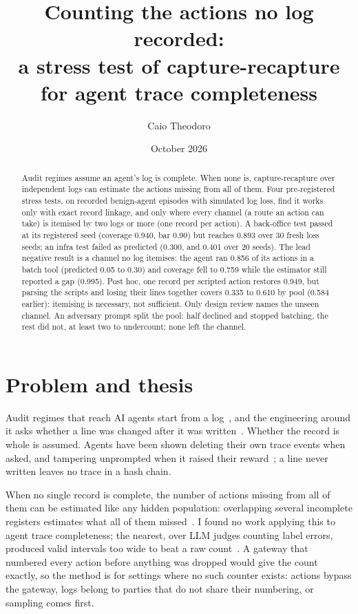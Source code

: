 \documentclass[11pt]{article}
\title{Counting the actions no log recorded:\\a stress test of capture-recapture for agent trace completeness}
\author{Caio Theodoro}
\date{October 2026}
\begin{document}
\maketitle

\begin{abstract}
Audit regimes assume an agent's log is complete. When none is, capture-recapture over
independent logs can estimate the actions missing from all of them. Four pre-registered
stress tests, on recorded benign-agent episodes with simulated log loss, find it works
only with exact record linkage, and only where every channel (a route an action can take)
is itemised by two logs or more (one record per action). A back-office test passed at its
registered seed (coverage 0.940, bar 0.90) but reaches 0.893 over 30 fresh loss seeds;
an infra test failed as predicted (0.300, and 0.401 over 20 seeds). The lead negative
result is a channel no log itemises: the agent ran 0.856 of its actions in a batch tool
(predicted 0.05 to 0.30) and coverage fell to 0.759 while the estimator still reported a
gap (0.995). Post hoc, one record per scripted action restores 0.949, but parsing the
scripts and losing their lines together covers 0.335 to 0.610 by pool (0.584 earlier):
itemising is necessary, not sufficient. Only design review names the unseen channel. An
adversary prompt split the pool: half declined and stopped batching, the rest did not, at
least two to undercount; none left the channel.
\end{abstract}

\section{Problem and thesis}

Audit regimes that reach AI agents start from a log~\citep{euaiact}, and the
engineering around it asks whether a line was changed after it was
written~\citep{flightrecorder2026,vet2025}. Whether the record is whole is
assumed. Agents have been shown deleting their own trace events when asked, and
tampering unprompted when it raised their reward~\citep{qin2026tamper}; a line
never written leaves no trace in a hash chain.

When no single record is complete, the number of actions missing from all of them can
be estimated like any hidden population: overlapping several incomplete registers
estimates what all of them missed~\citep{fienberg1972,bird2018mse}. I found no work
applying this to agent trace completeness; the nearest, over LLM judges counting label
errors, produced valid intervals too wide to beat a raw count~\citep{kansal2026labels}.
A gateway that numbered every action before anything was dropped would give the count
exactly, so the method is for settings where no such counter exists: actions bypass the
gateway, logs belong to parties that do not share their numbering, or sampling comes
first.
\end{document}

